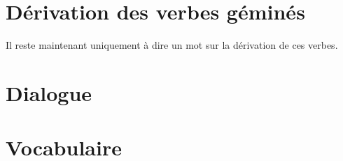 \section{Dérivation des verbes géminés}
Il reste maintenant uniquement à dire un mot sur la dérivation de ces verbes.


\section*{Dialogue}
\section*{Vocabulaire}